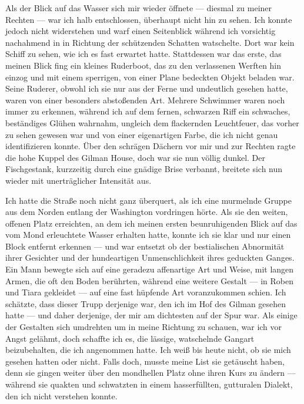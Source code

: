 Als der Blick auf das Wasser sich mir wieder öffnete --- diesmal zu meiner Rechten --- war ich halb entschlossen, überhaupt nicht hin zu sehen. Ich konnte jedoch nicht widerstehen und warf einen Seitenblick während ich vorsichtig nachahmend in in Richtung der schützenden Schatten watschelte. Dort war kein Schiff zu sehen, wie ich es fast erwartet hatte. Stattdessen war das erste, das meinen Blick fing ein kleines Ruderboot, das zu den verlassenen Werften hin einzog und mit einem sperrigen, von einer Plane bedeckten Objekt beladen war. Seine Ruderer, obwohl ich sie nur aus der Ferne und undeutlich gesehen hatte, waren von einer besonders abstoßenden Art. Mehrere Schwimmer waren noch immer zu erkennen, während ich auf dem fernen, schwarzen Riff ein schwaches, beständiges Glühen wahrnahm, ungleich dem flackernden Leuchtfeuer, das vorher zu sehen gewesen war und von einer eigenartigen Farbe, die ich nicht genau identifizieren konnte. Über den schrägen Dächern vor mir und zur Rechten ragte die hohe Kuppel des Gilman House, doch war sie nun völlig dunkel. Der Fischgestank, kurzzeitig durch eine gnädige Brise verbannt, breitete sich nun wieder mit unerträglicher Intensität aus.

Ich hatte die Straße noch nicht ganz überquert, als ich eine murmelnde Gruppe aus dem Norden entlang der Washington vordringen hörte. Als sie den weiten, offenen Platz erreichten, an dem ich meinen ersten beunruhigenden Blick auf das vom Mond erleuchtete Wasser erhalten hatte, konnte ich sie klar und nur einen Block entfernt erkennen --- und war entsetzt ob der bestialischen Abnormität ihrer Gesichter und der hundeartigen Unmenschlichkeit ihres geduckten Ganges. Ein Mann bewegte sich auf eine geradezu affenartige Art und Weise, mit langen Armen, die oft den Boden berührten, während eine weitere Gestalt --- in Roben und Tiara gekleidet --- auf eine fast hüpfende Art voranzukommen schien. Ich schätzte, dass dieser Trupp derjenige war, den ich im Hof des Gilman gesehen hatte --- und daher derjenige, der mir am dichtesten auf der Spur war. Als einige der Gestalten sich umdrehten um in meine Richtung zu schauen, war ich vor Angst gelähmt, doch schaffte ich es, die lässige, watschelnde Gangart beizubehalten, die ich angenommen hatte. Ich weiß bis heute nicht, ob sie mich gesehen hatten oder nicht. Falls doch, musste meine List sie getäuscht haben, denn sie gingen weiter über den mondhellen Platz ohne ihren Kurs zu ändern --- während sie quakten und schwatzten in einem hasserfüllten, gutturalen Dialekt, den ich nicht verstehen konnte.


